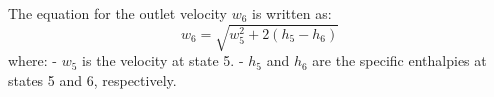 The equation for the outlet velocity \( w_6 \) is written as:  
\[
w_6 = \sqrt{w_5^2 + 2 \left( h_5 - h_6 \right)}
\]  
where:  
- \( w_5 \) is the velocity at state 5.  
- \( h_5 \) and \( h_6 \) are the specific enthalpies at states 5 and 6, respectively.